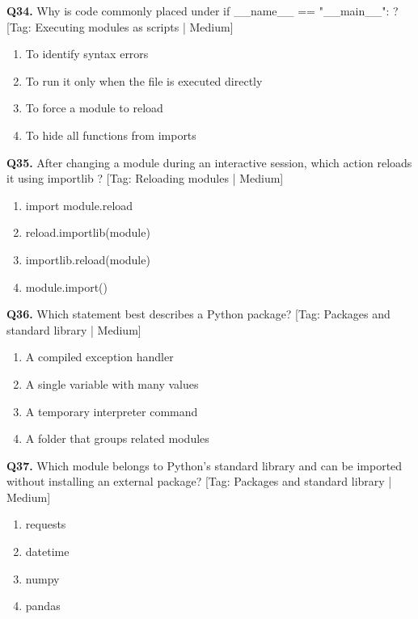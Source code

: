 \vspace{2mm}
\noindent\textbf{Q34.} Why is code commonly placed under if \_\_name\_\_ == "\_\_main\_\_": ? \hfill [Tag: Executing modules as scripts | Medium]
\begin{enumerate}[label=(\alph*),topsep=2pt,itemsep=1pt,partopsep=0pt,parsep=0pt]
    \item {To identify syntax errors}
    \item {To run it only when the file is executed directly}
    \item {To force a module to reload}
    \item {To hide all functions from imports}
\end{enumerate}
\vspace{2mm}
\noindent\textbf{Q35.} After changing a module during an interactive session, which action reloads it using importlib ? \hfill [Tag: Reloading modules | Medium]
\begin{enumerate}[label=(\alph*),topsep=2pt,itemsep=1pt,partopsep=0pt,parsep=0pt]
    \item {import module.reload}
    \item {reload.importlib(module)}
    \item {importlib.reload(module)}
    \item {module.import()}
\end{enumerate}
\vspace{2mm}
\noindent\textbf{Q36.} Which statement best describes a Python package? \hfill [Tag: Packages and standard library | Medium]
\begin{enumerate}[label=(\alph*),topsep=2pt,itemsep=1pt,partopsep=0pt,parsep=0pt]
    \item {A compiled exception handler}
    \item {A single variable with many values}
    \item {A temporary interpreter command}
    \item {A folder that groups related modules}
\end{enumerate}
\vspace{2mm}
\noindent\textbf{Q37.} Which module belongs to Python's standard library and can be imported without installing an external package? \hfill [Tag: Packages and standard library | Medium]
\begin{enumerate}[label=(\alph*),topsep=2pt,itemsep=1pt,partopsep=0pt,parsep=0pt]
    \item {requests}
    \item {datetime}
    \item {numpy}
    \item {pandas}
\end{enumerate}
